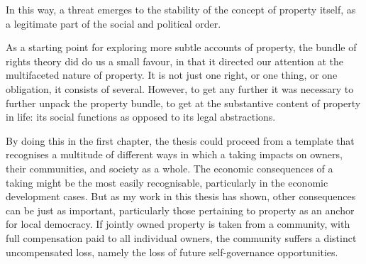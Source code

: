 
In this way, a threat emerges to the stability of the concept of property itself, as a legitimate part of the social and political order. 



As a starting point for exploring more subtle accounts of property, the bundle of rights theory did do us a small favour, in that it directed our attention at the multifaceted nature of property. It is not just one right, or one thing, or one obligation, it consists of several. However, to get any further it was necessary to further unpack the property bundle, to get at the substantive content of property in life: its social functions as opposed to its legal abstractions. 

By doing this in the first chapter, the thesis could proceed from a template that recognises a multitude of different ways in which a taking impacts on owners, their communities, and society as a whole. The economic consequences of a taking might be the most easily recognisable, particularly in the economic development cases. But as my work in this thesis has shown, other consequences can be just as important, particularly those pertaining to property as an anchor for local democracy. If jointly owned property is taken from a community, with full compensation paid to all individual owners, the community suffers a distinct uncompensated loss, namely the loss of future self-governance opportunities.

